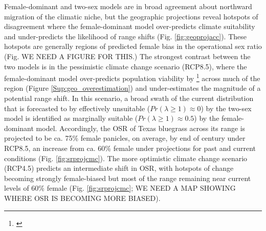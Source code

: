 \documentclass[12pt]{article}\usepackage[]{graphicx}\usepackage[dvipsnames]{xcolor}
\newcommand{\tom}[2]{{\color{red}{#1}}\footnote{\textit{\color{red}{#2}}}}
\begin{document}
Female-dominant and two-sex models are in broad agreement about northward migration of the climatic niche, but the geographic projections reveal hotspots of disagreement where the female-dominant model over-predicts climate suitability and under-predicts the likelihood of range shifts (Fig. \ref{fig:geoprojacc}). 
These hotspots are generally regions of predicted female bias in the operational sex ratio (Fig. WE NEED A FIGURE FOR THIS.) 
The strongest contrast between the two models is in the pessimistic climate change scenario (RCP8.5), where the female-dominant model over-predicts population viability by \tom{ca. 25\%}{I just eyeballed this. Real number should come from the histograms.} across much of the region (Figure \ref{Sup:geo_overestimation}) and under-estimates the magnitude of a potential range shift. 
In this scenario, a broad swath of the current distribution that is forecasted to by effectively unsuitable ($Pr(\lambda \ge 1) \approx 0$) by the two-sex model is identified as marginally suitable ($Pr(\lambda \ge 1) \approx 0.5$) by the female-dominant model. 
Accordingly, the OSR of Texas bluegrass across its range is projected to be ca. 75\% female panicles, on average, by end of century under RCP8.5, an increase from ca. 60\% female under projections for past and current conditions (Fig. \ref{fig:srprojcmc}). 
The more optimistic climate change scenario (RCP4.5) predicts an intermediate shift in OSR, with hotspots of change becoming strongly female-biased but most of the range remaining near current levels of 60\% female (Fig. \ref{fig:srprojcmc}; WE NEED A MAP SHOWING WHERE OSR IS BECOMING MORE BIASED). 
\end{document}
